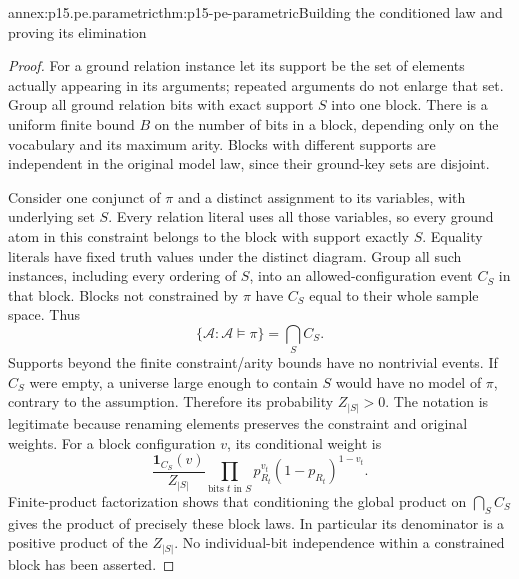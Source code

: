 \begin{annexitem}{annex:p15.pe.parametric}{thm:p15-pe-parametric}{Building the conditioned law and proving its elimination}
\begin{proof}
For a ground relation instance let its support be the set of elements
actually appearing in its arguments; repeated arguments do not enlarge
that set. Group all ground relation bits with exact support \(S\) into
one block. There is a uniform finite bound \(B\) on the number of bits
in a block, depending only on the vocabulary and its maximum arity.
Blocks with different supports are independent in the original model
law, since their ground-key sets are disjoint.

Consider one conjunct of \(\pi\) and a distinct assignment to its
variables, with underlying set \(S\). Every relation literal uses
all those variables, so every ground atom in this constraint belongs
to the block with support exactly \(S\). Equality literals have fixed
truth values under the distinct diagram. Group all such instances,
including every ordering of \(S\), into an allowed-configuration event
\(C_S\) in that block. Blocks not constrained by \(\pi\) have
\(C_S\) equal to their whole sample space. Thus
\[
   \{\mathcal A:\mathcal A\models\pi\}=\bigcap_S C_S.
\]
Supports beyond the finite constraint/arity bounds have no nontrivial
events. If \(C_S\) were empty, a universe large enough to contain \(S\)
would have no model of \(\pi\), contrary to the assumption. Therefore
its probability \(Z_{|S|}>0\). The notation is legitimate because
renaming elements preserves the constraint and original weights.
For a block configuration \(v\), its conditional weight is
\[
   \frac{\boldsymbol1_{C_S}(v)}
        {Z_{|S|}}\prod_{\text{bits }t\text{ in }S}
                      p_{R_t}^{v_t}(1-p_{R_t})^{1-v_t}.
\]
Finite-product factorization shows that conditioning the global
product on \(\bigcap_SC_S\) gives the product of precisely these
block laws. In particular its denominator is a positive product of
the \(Z_{|S|}\). No individual-bit independence within a constrained
block has been asserted.


\end{proof}
\end{annexitem}
